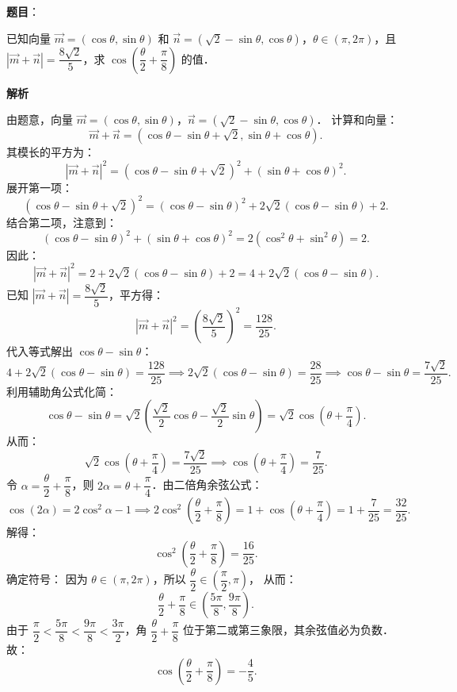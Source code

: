 \begin{answer}

\textbf{题目}：

已知向量 $\vec{m} = (\cos\theta, \sin\theta)$ 和 $\vec{n} = (\sqrt{2}-\sin\theta, \cos\theta)$，$\theta \in (\pi, 2\pi)$，且 $|\vec{m} + \vec{n}| = \dfrac{8\sqrt{2}}{5}$，求 $\cos\left(\dfrac{\theta}{2} + \dfrac{\pi}{8}\right)$ 的值．

\textbf{解析}

由题意，向量 $\vec{m} = (\cos\theta, \sin\theta)$，$\vec{n} = (\sqrt{2}-\sin\theta, \cos\theta)$．
计算和向量：
\nopagebreak[4]
\[
\vec{m} + \vec{n} = (\cos\theta - \sin\theta + \sqrt{2}, \sin\theta + \cos\theta).
\]
其模长的平方为：
\nopagebreak[4]
\[
|\vec{m} + \vec{n}|^2 = (\cos\theta - \sin\theta + \sqrt{2})^2 + (\sin\theta + \cos\theta)^2.
\]
展开第一项：
\nopagebreak[4]
\[
(\cos\theta - \sin\theta + \sqrt{2})^2 = (\cos\theta - \sin\theta)^2 + 2\sqrt{2}(\cos\theta - \sin\theta) + 2.
\]
结合第二项，注意到：
\nopagebreak[4]
\[
(\cos\theta - \sin\theta)^2 + (\sin\theta + \cos\theta)^2 = 2(\cos^2\theta + \sin^2\theta) = 2.
\]
因此：
\nopagebreak[4]
\[
|\vec{m} + \vec{n}|^2 = 2 + 2\sqrt{2}(\cos\theta - \sin\theta) + 2 = 4 + 2\sqrt{2}(\cos\theta - \sin\theta).
\]
已知 $|\vec{m} + \vec{n}| = \dfrac{8\sqrt{2}}{5}$，平方得：
\nopagebreak[4]
\[
|\vec{m} + \vec{n}|^2 = \left(\dfrac{8\sqrt{2}}{5}\right)^2 = \dfrac{128}{25}.
\]
代入等式解出 $\cos\theta - \sin\theta$：
\nopagebreak[4]
\[
4 + 2\sqrt{2}(\cos\theta - \sin\theta) = \dfrac{128}{25} \implies 2\sqrt{2}(\cos\theta - \sin\theta) = \dfrac{28}{25} \implies \cos\theta - \sin\theta = \dfrac{7\sqrt{2}}{25}.
\]
利用辅助角公式化简：
\nopagebreak[4]
\[
\cos\theta - \sin\theta = \sqrt{2}\left(\dfrac{\sqrt{2}}{2}\cos\theta - \dfrac{\sqrt{2}}{2}\sin\theta\right) = \sqrt{2}\cos\left(\theta + \dfrac{\pi}{4}\right).
\]
从而：
\nopagebreak[4]
\[
\sqrt{2}\cos\left(\theta + \dfrac{\pi}{4}\right) = \dfrac{7\sqrt{2}}{25} \implies \cos\left(\theta + \dfrac{\pi}{4}\right) = \dfrac{7}{25}.
\]
令 $\alpha = \dfrac{\theta}{2} + \dfrac{\pi}{8}$，则 $2\alpha = \theta + \dfrac{\pi}{4}$．由二倍角余弦公式：
\nopagebreak[4]
\[
\cos(2\alpha) = 2\cos^2\alpha - 1 \implies 2\cos^2\left(\dfrac{\theta}{2} + \dfrac{\pi}{8}\right) = 1 + \cos\left(\theta + \dfrac{\pi}{4}\right) = 1 + \dfrac{7}{25} = \dfrac{32}{25}.
\]
解得：
\nopagebreak[4]
\[
\cos^2\left(\dfrac{\theta}{2} + \dfrac{\pi}{8}\right) = \dfrac{16}{25}.
\]
确定符号：
因为 $\theta \in (\pi, 2\pi)$，所以 $\dfrac{\theta}{2} \in \left(\dfrac{\pi}{2}, \pi\right)$，
从而：
\nopagebreak[4]
\[
\dfrac{\theta}{2} + \dfrac{\pi}{8} \in \left(\dfrac{5\pi}{8}, \dfrac{9\pi}{8}\right).
\]
由于 $\dfrac{\pi}{2} < \dfrac{5\pi}{8} < \dfrac{9\pi}{8} < \dfrac{3\pi}{2}$，角 $\dfrac{\theta}{2} + \dfrac{\pi}{8}$ 位于第二或第三象限，其余弦值必为负数．
故：
\nopagebreak[4]
\[
\cos\left(\dfrac{\theta}{2} + \dfrac{\pi}{8}\right) = -\dfrac{4}{5}.
\]


\end{answer}
